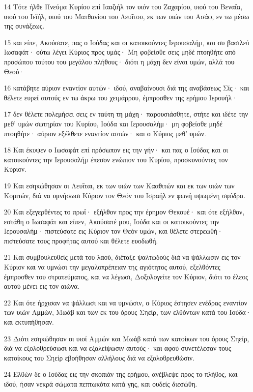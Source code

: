 \par 14 Τότε ήλθε Πνεύμα Κυρίου επί Ιααζιήλ τον υιόν του Ζαχαρίου, υιού του Βεναΐα, υιού του Ιεϊήλ, υιού του Ματθανίου του Λευΐτου, εκ των υιών του Ασάφ, εν τω μέσω της συνάξεως.
\par 15 και είπε, Ακούσατε, πας ο Ιούδας και οι κατοικούντες Ιερουσαλήμ, και συ βασιλεύ Ιωσαφάτ· ούτω λέγει Κύριος προς υμάς· Μη φοβείσθε σεις μηδέ πτοηθήτε από προσώπου τούτου του μεγάλου πλήθους· διότι η μάχη δεν είναι υμών, αλλά του Θεού·
\par 16 κατάβητε αύριον εναντίον αυτών· ιδού, αναβαίνουσι διά της αναβάσεως Σίς· και θέλετε ευρεί αυτούς εν τω άκρω του χειμάρρου, έμπροσθεν της ερήμου Ιερουήλ·
\par 17 δεν θέλετε πολεμήσει σεις εν ταύτη τη μάχη· παρουσιάσθητε, στήτε και ιδέτε την μεθ' υμών σωτηρίαν του Κυρίου, Ιούδα και Ιερουσαλήμ· μη φοβείσθε μηδέ πτοηθήτε· αύριον εξέλθετε εναντίον αυτών· και ο Κύριος μεθ' υμών.
\par 18 Και έκυψεν ο Ιωσαφάτ επί πρόσωπον εις την γήν· και πας ο Ιούδας και οι κατοικούντες την Ιερουσαλήμ έπεσον ενώπιον του Κυρίου, προσκυνούντες τον Κύριον.
\par 19 Και εσηκώθησαν οι Λευΐται, εκ των υιών των Κααθιτών και εκ των υιών των Κοριτών, διά να υμνήσωσι Κύριον τον Θεόν του Ισραήλ εν φωνή υψωμένη σφόδρα.
\par 20 Και εξεγερθέντες το πρωΐ· εξήλθον προς την έρημον Θεκουέ· και ότε εξήλθον, εστάθη ο Ιωσαφάτ και είπεν, Ακούσατέ μου, Ιούδα και οι κατοικούντες την Ιερουσαλήμ· πιστεύσατε εις Κύριον τον Θεόν υμών, και θέλετε στερεωθή· πιστεύσατε τους προφήτας αυτού και θέλετε ευοδωθή.
\par 21 Και συμβουλευθείς μετά του λαού, διέταξε ψαλτωδούς διά να ψάλλωσιν εις τον Κύριον και να υμνώσι την μεγαλοπρέπειαν της αγιότητος αυτού, εξελθόντες έμπροσθεν του στρατεύματος, και να λέγωσι, Δοξολογείτε τον Κύριον, διότι το έλεος αυτού μένει εις τον αιώνα.
\par 22 Και ότε ήρχισαν να ψάλλωσι και να υμνώσιν, ο Κύριος έστησεν ενέδρας εναντίον των υιών Αμμών, Μωάβ και των εκ του όρους Σηείρ, των ελθόντων κατά του Ιούδα· και εκτυπήθησαν.
\par 23 Διότι εσηκώθησαν οι υιοί Αμμών και Μωάβ κατά των κατοίκων του όρους Σηείρ, διά να εξολοθρεύσωσι και να εξαλείψωσιν αυτούς· και αφού συνετέλεσαν τους κατοίκους του Σηείρ εβοήθησαν αλλήλους διά να εξολοθρευθώσιν.
\par 24 Ελθών δε ο Ιούδας εις την σκοπιάν της ερήμου, ανέβλεψε προς το πλήθος, και ιδού, ήσαν νεκρά σώματα πεπτωκότα κατά γης, και ουδείς διεσώθη.
